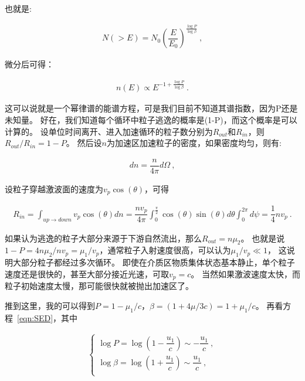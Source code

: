 也就是:

\begin{equation}
    \begin{aligned}
      N(>E)=N_{0}\left(\dfrac{E}{E_{0}}\right)^{\frac{\log P}{\log \beta}} \ ,
    \end{aligned}
\end{equation}

微分后可得：

\begin{equation}
  \label{eqn:SED}
    \begin{aligned}
      n(E) \propto E^{-1+\frac{\log P}{\log \beta}} \ .
    \end{aligned}
\end{equation}

这可以说就是一个幂律谱的能谱方程，可是我们目前不知道其谱指数，因为P还是未知量。
好在，我们知道每个循环中粒子逃逸的概率是(1-P)，而这个概率是可以计算的。
设单位时间离开、进入加速循环的粒子数分别为$R_{out}$和$R_{in}$，则
$R_{out}/R_{in}=1-P$。
然后设$n$为加速区加速粒子的密度，如果密度均匀，则有:

\begin{equation}
    \begin{aligned}
      dn=\dfrac{n}{4 \pi} d \Omega \ ,
    \end{aligned}
\end{equation}

设粒子穿越激波面的速度为$v_p\cos(\theta)$，可得

\begin{equation}
    \begin{aligned}
      R_{i n}=\int_{u p \rightarrow d o w n} v_p \cos (\theta) d n =
      \dfrac{n v_p}{4 \pi} \int_{0}^{\frac{\pi}{2}} \cos (\theta) \sin (\theta)
      d \theta \int_{0}^{2 \pi} d \psi=\dfrac{1}{4} n v_p \ .
    \end{aligned}
\end{equation}

如果认为逃逸的粒子大部分来源于下游自然流出，那么$R_{out}=n\mu_2$。
也就是说$1-P=4n\mu_2/nv_p=\mu_1/v_p$，通常粒子入射速度很高，可以认为$\mu_1/v_p \ll 1$，
这说明大部分粒子都经过多次循环。
即使在介质区物质集体状态基本静止，单个粒子速度还是很快的，甚至大部分接近光速，可取$v_p=c$。
当然如果激波速度太快，而粒子初始速度太慢，那可能很快就被抛出加速区了。

推到这里，我的可以得到$P=1-\mu_1/c$，$\beta=(1+4\mu/3c)=1+\mu_1/c$。
再看方程~\ref{eqn:SED}，其中

\begin{equation}
    \begin{aligned}
        \begin{cases}
          \log P=\log \left(1-\dfrac{u_{1}}{c}\right) \sim-\dfrac{u_{1}}{c} \ , \\

          \log \beta=\log \left(1+\dfrac{u_{1}}{c}\right) \sim \dfrac{u_{1}}{c} \ , \\
        \end{cases}
    \end{aligned}
\end{equation}


